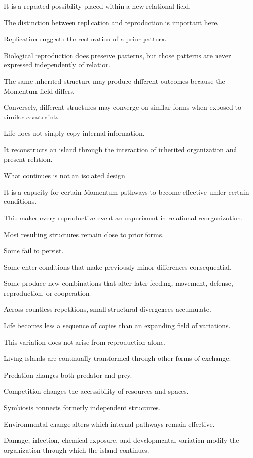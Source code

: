 It is a repeated possibility placed within a new relational field.

The distinction between replication and reproduction is important here.

Replication suggests the restoration of a prior pattern.

Biological reproduction does preserve patterns, but those patterns are never expressed independently of relation.

The same inherited structure may produce different outcomes because the Momentum field differs.

Conversely, different structures may converge on similar forms when exposed to similar constraints.

Life does not simply copy internal information.

It reconstructs an island through the interaction of inherited organization and present relation.

What continues is not an isolated design.

It is a capacity for certain Momentum pathways to become effective under certain conditions.

This makes every reproductive event an experiment in relational reorganization.

Most resulting structures remain close to prior forms.

Some fail to persist.

Some enter conditions that make previously minor differences consequential.

Some produce new combinations that alter later feeding, movement, defense, reproduction, or cooperation.

Across countless repetitions, small structural divergences accumulate.

Life becomes less a sequence of copies than an expanding field of variations.

This variation does not arise from reproduction alone.

Living islands are continually transformed through other forms of exchange.

Predation changes both predator and prey.

Competition changes the accessibility of resources and spaces.

Symbiosis connects formerly independent structures.

Environmental change alters which internal pathways remain effective.

Damage, infection, chemical exposure, and developmental variation modify the organization through which the island continues.

